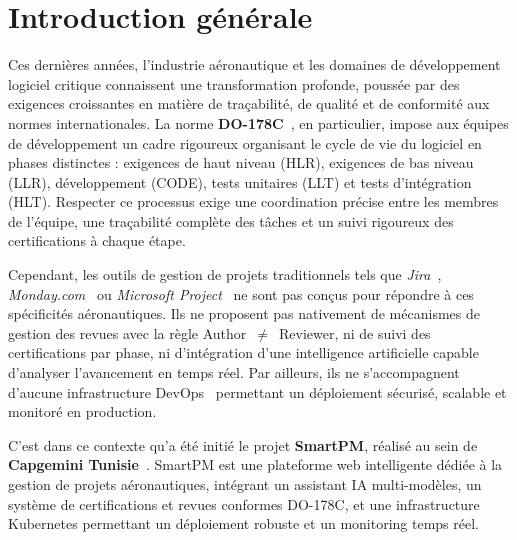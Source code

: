 \chapter*{Introduction générale}

\vspace{0.3cm}

Ces dernières années, l'industrie aéronautique et les domaines de développement logiciel
critique connaissent une transformation profonde, poussée par des exigences croissantes
en matière de traçabilité, de qualité et de conformité aux normes internationales. La
norme \textbf{DO-178C}~\cite{do178c}, en particulier, impose aux équipes de développement un cadre
rigoureux organisant le cycle de vie du logiciel en phases distinctes : exigences de haut
niveau (HLR), exigences de bas niveau (LLR), développement (CODE), tests unitaires (LLT)
et tests d'intégration (HLT). Respecter ce processus exige une coordination précise entre
les membres de l'équipe, une traçabilité complète des tâches et un suivi rigoureux des
certifications à chaque étape.

\vspace{0.3cm}

Cependant, les outils de gestion de projets traditionnels tels que \textit{Jira}~\cite{jira},
\textit{Monday.com}~\cite{monday} ou \textit{Microsoft Project}~\cite{msproject} ne sont pas conçus pour répondre à ces
spécificités aéronautiques. Ils ne proposent pas nativement de mécanismes de gestion des
revues avec la règle Author~$\neq$~Reviewer, ni de suivi des certifications par phase, ni
d'intégration d'une intelligence artificielle capable d'analyser l'avancement en temps réel.
Par ailleurs, ils ne s'accompagnent d'aucune infrastructure DevOps~\cite{devops} permettant un déploiement
sécurisé, scalable et monitoré en production.

\vspace{0.3cm}

C'est dans ce contexte qu'a été initié le projet \textbf{SmartPM}, réalisé au sein de
\textbf{Capgemini Tunisie}~\cite{capgemini}. SmartPM est une plateforme web intelligente dédiée à la gestion
de projets aéronautiques, intégrant un assistant IA multi-modèles, un système de certifications
et revues conformes DO-178C, et une infrastructure Kubernetes permettant un déploiement
robuste et un monitoring temps réel.

